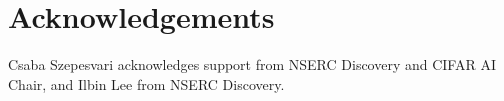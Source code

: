 \section*{Acknowledgements}

Csaba Szepesvari acknowledges support from NSERC Discovery and CIFAR AI Chair, and Ilbin Lee from NSERC Discovery.